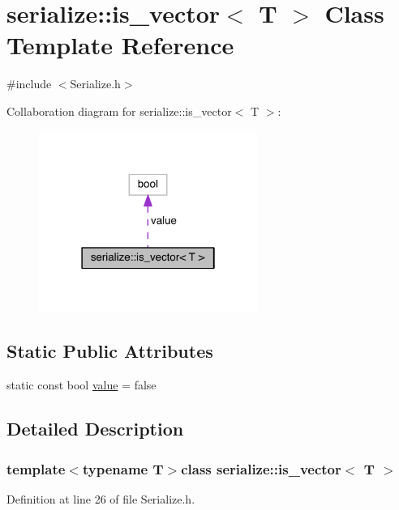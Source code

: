 \hypertarget{classserialize_1_1is__vector}{}\section{serialize\+:\+:is\+\_\+vector$<$ T $>$ Class Template Reference}
\label{classserialize_1_1is__vector}


{\ttfamily \#include $<$Serialize.\+h$>$}



Collaboration diagram for serialize\+:\+:is\+\_\+vector$<$ T $>$\+:\nopagebreak
\begin{figure}[H]
\begin{center}
\leavevmode
\includegraphics[width=202pt]{classserialize_1_1is__vector__coll__graph}
\end{center}
\end{figure}
\subsection*{Static Public Attributes}
\begin{DoxyCompactItemize}
\item 
static const bool \hyperlink{classserialize_1_1is__vector_ad0b95082b20edc56d4884e210a7ab985}{value} = false
\end{DoxyCompactItemize}


\subsection{Detailed Description}
\subsubsection*{template$<$typename T$>$class serialize\+::is\+\_\+vector$<$ T $>$}



Definition at line 26 of file Serialize.\+h.



